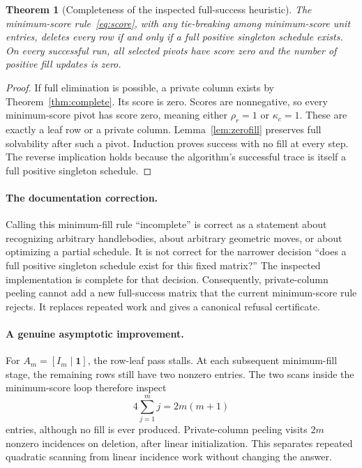 \documentclass[11pt]{article}
\newtheorem{theorem}{Theorem}[section]
\theoremstyle{definition}\newtheorem{definition}[theorem]{Definition}
\theoremstyle{remark}\newtheorem{remark}[theorem]{Remark}
\begin{document}
\begin{theorem}[Completeness of the inspected full-success heuristic]
\label{thm:native}
The minimum-score rule~\eqref{eq:score}, with any tie-breaking among minimum-score unit entries, deletes every row if and only if a full positive singleton schedule exists. On every successful run, all selected pivots have score zero and the number of positive fill updates is zero.
\end{theorem}
\begin{proof}
If full elimination is possible, a private column exists by Theorem~\ref{thm:complete}. Its score is zero. Scores are nonnegative, so every minimum-score pivot has score zero, meaning either $\rho_r=1$ or $\kappa_c=1$. These are exactly a leaf row or a private column. Lemma~\ref{lem:zerofill} preserves full solvability after such a pivot. Induction proves success with no fill at every step. The reverse implication holds because the algorithm's successful trace is itself a full positive singleton schedule.
\end{proof}

\paragraph{The documentation correction.}
Calling this minimum-fill rule ``incomplete'' is correct as a statement about recognizing arbitrary handlebodies, about arbitrary geometric moves, or about optimizing a partial schedule. It is not correct for the narrower decision ``does a full positive singleton schedule exist for this fixed matrix?'' The inspected implementation is complete for that decision. Consequently, private-column peeling cannot add a new full-success matrix that the current minimum-score rule rejects. It replaces repeated work and gives a canonical refusal certificate.

\paragraph{A genuine asymptotic improvement.}
For $A_m=[I_m\mid\mathbf1]$, the row-leaf pass stalls. At each subsequent minimum-fill stage, the remaining rows still have two nonzero entries. The two scans inside the minimum-score loop therefore inspect
\begin{equation}
 4\sum_{j=1}^m j=2m(m+1)
 \label{eq:scans}
\end{equation}
entries, although no fill is ever produced. Private-column peeling visits $2m$ nonzero incidences on deletion, after linear initialization. This separates repeated quadratic scanning from linear incidence work without changing the answer.
\end{document}
